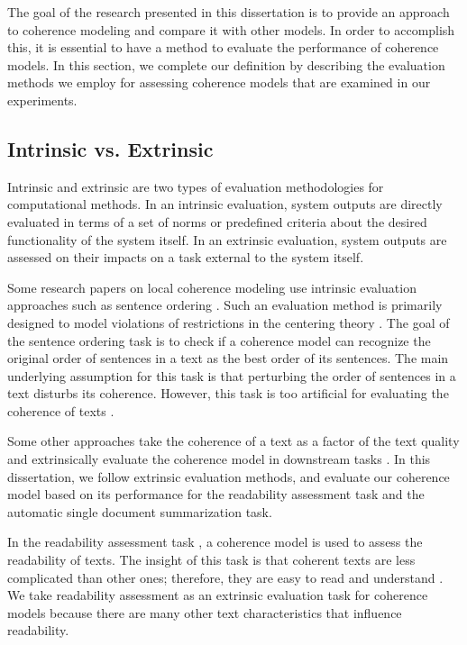The goal of the research presented in this dissertation is to provide an approach to coherence modeling and compare it with other models. 
In order to accomplish this, it is essential to have a method to evaluate the performance of coherence models. 
In this section, we complete our definition by describing the evaluation methods we employ for assessing coherence models that are examined in our experiments. 

\subsection{Intrinsic vs. Extrinsic}

Intrinsic and extrinsic are two types of evaluation methodologies for computational methods.  
In an intrinsic evaluation, system outputs are directly evaluated in terms of a set of norms or predefined criteria about the desired functionality of the system itself. 
In an extrinsic evaluation, system outputs are assessed on their impacts on a task external to the system itself. 

Some research papers on local coherence modeling use intrinsic evaluation approaches such as sentence ordering \cite{lapata03, mihalcea04b, karamanis04a, barzilay04, barzilay08}. 
Such an evaluation method is primarily designed to model violations of restrictions in the centering theory \cite{karamanis04a}. 
The goal of the sentence ordering task is to check if a coherence model can recognize the original order of sentences in a text as the best order of its sentences. 
The main underlying assumption for this task is that perturbing the order of sentences in a text disturbs its coherence.  
However, this task is too artificial for evaluating the coherence of texts \cite{lai18}.  

Some other approaches take the coherence of a text as a factor of the text quality and extrinsically evaluate the coherence model in downstream tasks \cite{miltsakaki04a,yannakoudakis12}. 
In this dissertation, we follow extrinsic evaluation methods, and evaluate our coherence model based on its performance for the readability assessment task and the automatic single document summarization task.  

In the readability assessment task  \cite{miltsakaki00,pitler08,petersen09,flor13}, a coherence model is used to assess the readability of texts. 
The insight of this task is that coherent texts are less complicated than other ones; therefore, they are easy to read and understand \cite{pitler08}. 
We take readability assessment as an extrinsic evaluation task for coherence models because there are many other text characteristics that influence readability.  

